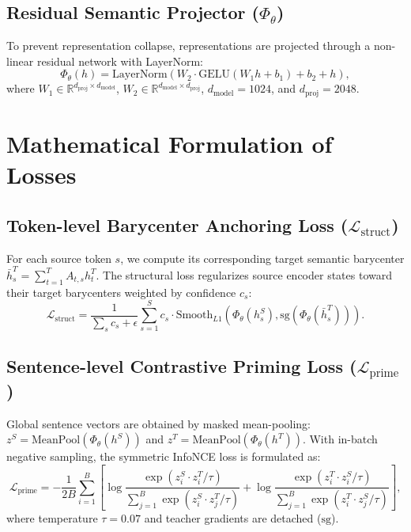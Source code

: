 \documentclass[11pt,a4paper]{article}
\begin{document}
\subsection{Residual Semantic Projector ($\Phi_\theta$)}
To prevent representation collapse, representations are projected through a non-linear residual network with LayerNorm:
\begin{equation}
    \Phi_\theta(h) = \text{LayerNorm}(W_2 \cdot \text{GELU}(W_1 h + b_1) + b_2 + h),
\end{equation}
where $W_1 \in \mathbb{R}^{d_{\text{proj}} \times d_{\text{model}}}$, $W_2 \in \mathbb{R}^{d_{\text{model}} \times d_{\text{proj}}}$, $d_{\text{model}} = 1024$, and $d_{\text{proj}} = 2048$.

\section{Mathematical Formulation of Losses}
\label{sec:losses}

\subsection{Token-level Barycenter Anchoring Loss ($\mathcal{L}_{\text{struct}}$)}
For each source token $s$, we compute its corresponding target semantic barycenter $\bar{h}_s^T = \sum_{t=1}^T A_{t, s} h_t^T$. The structural loss regularizes source encoder states toward their target barycenters weighted by confidence $c_s$:
\begin{equation}
    \mathcal{L}_{\text{struct}} = \frac{1}{\sum_s c_s + \epsilon} \sum_{s=1}^S c_s \cdot \text{Smooth}_{L1}\left(\Phi_\theta(h_s^S), \text{sg}(\Phi_\theta(\bar{h}_s^T))\right).
\end{equation}

\subsection{Sentence-level Contrastive Priming Loss ($\mathcal{L}_{\text{prime}}$)}
Global sentence vectors are obtained by masked mean-pooling: $z^S = \text{MeanPool}(\Phi_\theta(h^S))$ and $z^T = \text{MeanPool}(\Phi_\theta(h^T))$. With in-batch negative sampling, the symmetric InfoNCE loss is formulated as:
\begin{equation}
    \mathcal{L}_{\text{prime}} = -\frac{1}{2B} \sum_{i=1}^B \left[ \log \frac{\exp(z_i^S \cdot z_i^T / \tau)}{\sum_{j=1}^B \exp(z_i^S \cdot z_j^T / \tau)} + \log \frac{\exp(z_i^T \cdot z_i^S / \tau)}{\sum_{j=1}^B \exp(z_i^T \cdot z_j^S / \tau)} \right],
\end{equation}
where temperature $\tau = 0.07$ and teacher gradients are detached ($\text{sg}$).
\end{document}
